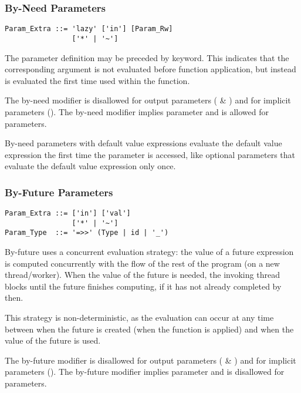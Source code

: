 \subsubsection{By-Need Parameters}
\label{sec:by-need-parameters}

\syntax\begin{lstlisting}
Param_Extra ::= 'lazy' ['in'] [Param_Rw]
                ['*' | '~']
\end{lstlisting}

The parameter definition may be preceded by  keyword. This indicates that the corresponding argument is not evaluated before function application, but instead is evaluated the first time used within the function. 

The by-need modifier is disallowed for output parameters ( \& ) and for implicit parameters (). The by-need modifier implies  parameter and is allowed for  parameters. 

By-need parameters with default value expressions evaluate the default value expression the first time the parameter is accessed, like optional parameters that evaluate the default value expression only once. 






\subsubsection{By-Future Parameters}
\label{sec:by-future-parameters}

\syntax\begin{lstlisting}
Param_Extra ::= ['in'] ['val']
                ['*' | '~']
Param_Type  ::= '=>>' (Type | id | '_')
\end{lstlisting}

By-future uses a concurrent evaluation strategy: the value of a future expression is computed concurrently with the flow of the rest of the program (on a new thread/worker). When the value of the future is needed, the invoking thread blocks until the future finishes computing, if it has not already completed by then. 

This strategy is non-deterministic, as the evaluation can occur at any time between when the future is created (when the function is applied) and when the value of the future is used. 

The by-future modifier is disallowed for output parameters ( \& ) and for implicit parameters (). The by-future modifier implies  parameter and is disallowed for  parameters. 

